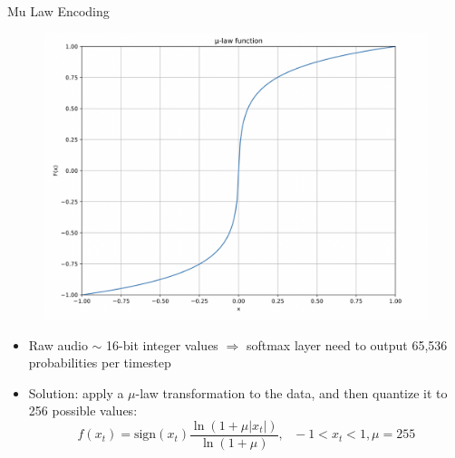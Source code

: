 \begin{frame}{Mu Law Encoding}
    \begin{figure}
    	\centering
    	\includegraphics[width=0.5\linewidth]{figs/mu_law.png}
    \end{figure}
    \begin{itemize}
        \item Raw audio $\sim$ 16-bit integer values $\Rightarrow$ softmax layer need to output 65,536 probabilities per timestep
        \item Solution: apply a $\mu$-law transformation to the data, and then quantize it to 256 possible values:
        $$f\left(x_{t}\right)=\mathrm{sign}(x_{t})\frac{\ln\left(1+\mu\left|x_{t}\right|\right)}{\ln\left(1+\mu\right)}, ~~~ -1 < x_t < 1, \mu = 255$$
    \end{itemize}
\end{frame}
